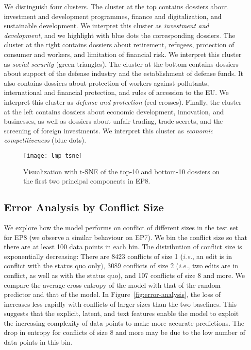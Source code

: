 We distinguish four clusters.
The cluster at the top contains dossiers about investment and development programmes, finance and digitalization, and sustainable development.
We interpret this cluster as \textit{investment and development}, and we highlight with blue dots the corresponding dossiers.
The cluster at the right contains dossiers about retirement, refugees, protection of consumer and workers, and limitation of financial risk.
We interpret this cluster as \textit{social security} (green triangles).
The cluster at the bottom contains dossiers about support of the defense industry and the establishment of defense funds.
It also contains dossiers about protection of workers against pollutants, international and financial protection, and rules of accession to the EU.
We interpret this cluster as \textit{defense and protection} (red crosses).
Finally, the cluster at the left contains dossiers about economic development, innovation, and businesses, as well as dossiers about unfair trading, trade secrets, and the screening of foreign investments.
We interpret this cluster as \textit{economic competitiveness} (blue dots).

\begin{figure}
  \centering
  \texttt{[image: lmp-tsne]}
	\caption{Visualization with t-SNE of the top-10 and bottom-10 dossiers on the first two principal components in EP8.}
	\label{fig:tsne}
\end{figure}

\subsection{Error Analysis by Conflict Size}

We explore how the  model performs on conflict of different sizes in the test set for EP8 (we observe a similar behaviour on EP7).
We bin the conflict size so that there are at least 100 data points in each bin.
The distribution of conflict size is exponentially decreasing:
There are 8423 conflicts of size 1 (\textit{i.e.}, an edit is in conflict with the status quo only), 3089 conflicts of size 2 (\textit{i.e.}, two edits are in conflict, as well as with the status quo),  and 107 conflicts of size 8 and more.
We compare the average cross entropy of the  model with that of the random predictor and that of the \wow{} model.
In Figure~\ref{fig:error-analysis}, the loss of  increases less rapidly with conflicts of larger sizes than the two baselines.
This suggests that the explicit, latent, and text features enable the model to exploit the increasing complexity of data points to make more accurate predictions.
The drop in entropy for conflicts of size 8 and more may be due to the low number of data points in this bin.

